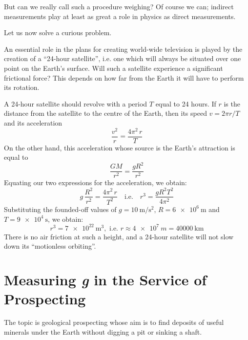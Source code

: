 But can we really call such a procedure weighing?
Of course we can; indirect measurements play at least
as great a role in physics as direct measurements.

Let us now solve a curious problem.

An essential role in the plans for creating world-wide
television is played by the creation of a ``24-hour satellite'', i.e. one which will always be situated over one
point on the Earth's surface. Will such a satellite experience a significant frictional force? This depends on
how far from the Earth it will have to perform its rotation.

A 24-hour satellite should revolve with a period $T$
equal to 24 hours. If $r$ is the distance from the satellite
to the centre of the Earth, then its speed $v = 2 \pi r/T$
and its acceleration 
 \begin{equation*}%
\dfrac{v^{2}}{r} =  \dfrac{4 \pi^{2} \, r}{T}
 \end{equation*}
On the other hand, this acceleration whose source is the Earth's attraction
is equal to 
 \begin{equation*}%
\dfrac{GM}{r^{2}}= \dfrac{gR^{2}}{r^{2}}
 \end{equation*}
Equating our two expressions for the acceleration, we obtain:
 \begin{equation*}%
g \, \dfrac{R^{2}}{r^{2}}=  \dfrac{4 \pi^{2} \, r}{T^{2}} \quad \textrm{i.e.} \quad r^{3} =   \dfrac{g R^{2} T^{2}}{4 \pi^{2}} 
 \end{equation*}
Substituting the founded-off values of $g = \SI{10}{\meter\per\second\squared}$,
$R = \SI{6e6}{\meter}$ and $T = \SI{9e4}{\second}$, we obtain: 
 \begin{equation*}%
r^{3} = \SI{7e22}{\meter\cubed}, \,\, \textrm{i.e.} \,\, r \approx \SI{4e7}{m} =  \SI{40000}{\kilo\meter} 
\end{equation*}
 There is no air friction at such a height, and a 24-hour satellite will not slow down its ``motionless orbiting''.
	
\section{Measuring \emph{g} in the Service of Prospecting}

The topic is geological prospecting whose aim is to find deposits of useful minerals under the Earth without
digging a pit or sinking a shaft.


